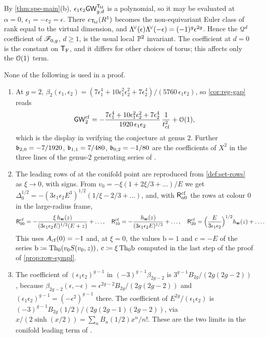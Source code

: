 \begin{rmk}
\label{rmk:reg-unref}
By \cref{thm:spe-main}(b), $\epsilon_1\epsilon_2\mathsf{GW}_{g,d}^{\mathsf{T}_{\!\mathrm{M}}}$ is a polynomial, so it may be evaluated at $\alpha=0$, $\epsilon_1=-\epsilon_2=\epsilon$. There $e_{\mathsf{T}_{\!\mathrm{M}}}(R^1)$ becomes the non-equivariant Euler class of rank equal to the virtual dimension, and $\Lambda^{\!\vee}(\epsilon)\Lambda^{\!\vee}(-\epsilon)=(-1)^g\epsilon^{2g}$. Hence the $\mathcal{Q}^d$ coefficient of $\mathscr{F}_{0,g}$, $d\geq 1$, is the usual local $\mathbb{P}^2$ invariant. The coefficient at $d=0$ is the constant on $\mathsf{T}_{\mathrm{F}}$, and it differs for other choices of torus; this affects only the $\mathcal{O}(1)$ term.
\end{rmk}

\begin{rmk}
\label{rmk:reg-compare}
None of the following is used in a proof.
\begin{enumerate}
\item At $g=2$, $\beta_2(\epsilon_1,\epsilon_2)=(7\epsilon_1^4+10\epsilon_1^2\epsilon_2^2+7\epsilon_2^4)/(5760\,\epsilon_1\epsilon_2)$, so \cref{cor:reg-gap} reads
\[
\mathsf{GW}^{\mathrm{cf}}_2=-\frac{7\epsilon_1^4+10\epsilon_1^2\epsilon_2^2+7\epsilon_2^4}{1920\,\epsilon_1\epsilon_2}\,\frac{1}{t_{\mathrm{cf}}^2}+\mathcal{O}(1),
\]
which is the display in \cite{BS} verifying the conjecture at genus $2$. Further $\mathfrak{b}_{2,0}=-7/1920$, $\mathfrak{b}_{1,1}=7/480$, $\mathfrak{b}_{0,2}=-1/80$ are the coefficients of $X^2$ in the three lines of the genus-$2$ generating series of \cite{BS}. 
\item The leading rows of \cite{BS} at the conifold point are reproduced from \cref{def:set-rows} as $\xi\to 0$, with signs. From $v_0=-\xi(1+2\xi/3+\dots)/E$ we get $\Delta_0^{1/2}=-(3\epsilon_1\epsilon_2E^3)^{1/2}(1/\xi-2/3+\dots)$, and, with $\mathsf{R}^{\mathrm{cf}}_{a0}$ the rows at colour $0$ in the large-radius frame,
\[
\mathsf{R}^{\mathrm{cf}}_{00}=-\frac{\xi\,h_{\mathbf{w}}(z)}{(3\epsilon_1\epsilon_2E)^{1/2}(E+z)}+\dots,\quad
\mathsf{R}^{\mathrm{cf}}_{10}=-\frac{h_{\mathbf{w}}(z)}{(3\epsilon_1\epsilon_2E)^{1/2}}+\dots,\quad
\mathsf{R}^{\mathrm{cf}}_{20}=\Big(\frac{E}{3\epsilon_1\epsilon_2}\Big)^{1/2}h_{\mathbf{w}}(z)+\dots.
\]
This uses $A_{\mathrm{cf}}(0)=-1$ and, at $\xi=0$, the values $\mathrm{b}=1$ and $\mathrm{c}=-E$ of the series $\mathrm{b}\coloneqq\mathrm{Th}_0(v_0S(v_0,z))$, $\mathrm{c}\coloneqq\xi\,\mathrm{Th}_0\mathrm{b}$ computed in the last step of the proof of \cref{prop:row-sympl}. 
\item The coefficient of $(\epsilon_1\epsilon_2)^{g-1}$ in $(-3)^{g-1}\beta_{2g-2}$ is $3^{g-1}B_{2g}/(2g(2g-2))$, because $\beta_{2g-2}(\epsilon,-\epsilon)=\epsilon^{2g-2}B_{2g}/(2g(2g-2))$ and $(\epsilon_1\epsilon_2)^{g-1}=(-\epsilon^2)^{g-1}$ there. The coefficient of $E^{2g}/(\epsilon_1\epsilon_2)$ is $(-3)^{g-1}B_{2g}(1/2)/(2g(2g-1)(2g-2))$, via $x/(2\sinh(x/2))=\sum_n B_n(1/2)x^n/n!$. These are the two limits in the conifold leading term of \cite{BS}. 

\end{enumerate}
\end{rmk}
